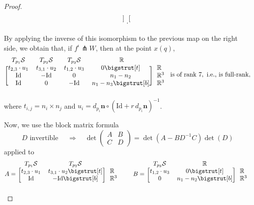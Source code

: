 \documentclass[11pt]{article}
\newcommand{\R}{\mathbb{R}}
\newcommand{\io}{\iota}
\newcommand{\nbf}{\mathbf{n}}
\newcommand{\Surf}{\mathcal{S}}
\newcommand{\Id}{\mathrm{Id}}
\newcommand\topstrut[1][1.2ex]{\setlength\bigstrutjot{#1}{\bigstrut[t]}}
\newcommand\botstrut[1][1.2ex]{\setlength\bigstrutjot{#1}{\bigstrut[b]}}
\theoremstyle{plain}
\theoremstyle{definition}
\theoremstyle{remark}
\begin{document}
\begin{proof}
\begin{equation*}
\begin{blockarray}{ccccl}
\begin{block}{[cccc] l}
				\end{block}
			\end{blockarray}.
		\end{equation*}
		By applying the inverse of this isomorphism to the previous map on the right side, we obtain that, if $f^\io \pitchfork W$, then at the point $x(q)$,
		\begin{equation*}
			\begin{blockarray}{ccccl}
				\begin{block}{ccccl}
					T_{p_1} \Surf & T_{p_2} \Surf & T_{p_3} \Surf & ~~\R~~ & \\
				\end{block}
				\begin{block}{[cccc] l}
					t_{2,3} \cdot u_1 & t_{3,1} \cdot u_2 & t_{1,2} \cdot u_3 & 0 \topstrut & \R \\
					\Id & - \Id & 0 & n_1 - n_2 & \R^3 \\
					\Id & 0 & - \Id & n_1 - n_3 \botstrut & \R^3 \\
				\end{block}
			\end{blockarray}
			\text{ is of rank } 7, \text{ i.e., is full-rank},
		\end{equation*}
		where $t_{i,j} = n_i \times n_j$ and $u_i =  d_{p_i} \nbf \circ (\Id + r \, d_{p_i} \nbf)^{-1}$.
		
		Now, we use the block matrix formula
		\[D \text{ invertible } \quad \Rightarrow \quad \det 
		\begin{pmatrix}
			A & B \\
			C & D
		\end{pmatrix} = \det(A - B D^{-1} C) \det(D)\]
		applied to 
		\[A = 
		\begin{blockarray}{ccl}
			\begin{block}{ccl}
				T_{p_1} \Surf & T_{p_2} \Surf & \\
			\end{block}
			\begin{block}{[cc] l}
				t_{2,3} \cdot u_1 & t_{3,1} \cdot u_2 \topstrut & \R \\
				\Id & - \Id \botstrut & \R^3 \\
			\end{block}
		\end{blockarray}
		\qquad
		B = 
		\begin{blockarray}{ccl}
			\begin{block}{ccl}
				T_{p_3} \Surf & \R & \\
			\end{block}
			\begin{block}{[cc] l}
				t_{1,2} \cdot u_3 & 0 \topstrut & \R \\
				0 & n_1 - n_2 \botstrut & \R^3 \\
			\end{block}
		\end{blockarray}
		\]
		

\end{proof}
\end{document}
